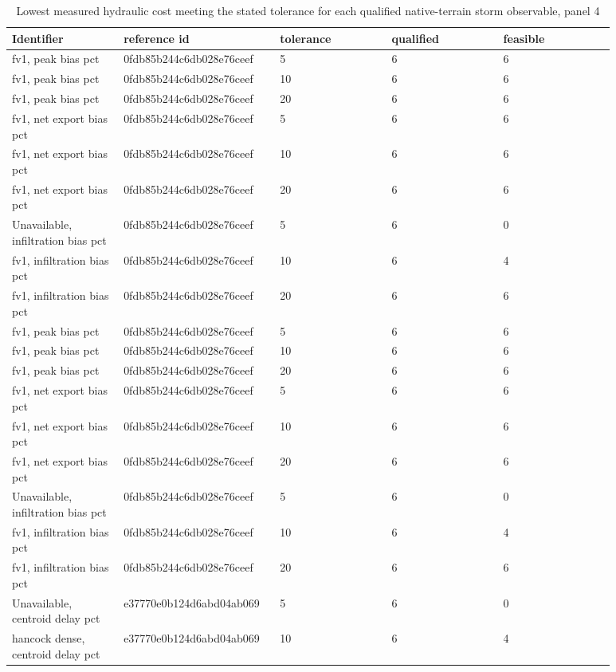 \begin{longtable}{p{0.1760\linewidth}p{0.1760\linewidth}p{0.1760\linewidth}p{0.1760\linewidth}p{0.1760\linewidth}}
\caption{Lowest measured hydraulic cost meeting the stated tolerance for each qualified native-terrain storm observable, panel 4}\\
\hline
Identifier & reference id & tolerance & qualified & feasible \\
\hline\endhead
fv1, peak bias pct & 0fdb85b244c6db028e76ceef & 5 & 6 & 6 \\
fv1, peak bias pct & 0fdb85b244c6db028e76ceef & 10 & 6 & 6 \\
fv1, peak bias pct & 0fdb85b244c6db028e76ceef & 20 & 6 & 6 \\
fv1, net export bias pct & 0fdb85b244c6db028e76ceef & 5 & 6 & 6 \\
fv1, net export bias pct & 0fdb85b244c6db028e76ceef & 10 & 6 & 6 \\
fv1, net export bias pct & 0fdb85b244c6db028e76ceef & 20 & 6 & 6 \\
Unavailable, infiltration bias pct & 0fdb85b244c6db028e76ceef & 5 & 6 & 0 \\
fv1, infiltration bias pct & 0fdb85b244c6db028e76ceef & 10 & 6 & 4 \\
fv1, infiltration bias pct & 0fdb85b244c6db028e76ceef & 20 & 6 & 6 \\
fv1, peak bias pct & 0fdb85b244c6db028e76ceef & 5 & 6 & 6 \\
fv1, peak bias pct & 0fdb85b244c6db028e76ceef & 10 & 6 & 6 \\
fv1, peak bias pct & 0fdb85b244c6db028e76ceef & 20 & 6 & 6 \\
fv1, net export bias pct & 0fdb85b244c6db028e76ceef & 5 & 6 & 6 \\
fv1, net export bias pct & 0fdb85b244c6db028e76ceef & 10 & 6 & 6 \\
fv1, net export bias pct & 0fdb85b244c6db028e76ceef & 20 & 6 & 6 \\
Unavailable, infiltration bias pct & 0fdb85b244c6db028e76ceef & 5 & 6 & 0 \\
fv1, infiltration bias pct & 0fdb85b244c6db028e76ceef & 10 & 6 & 4 \\
fv1, infiltration bias pct & 0fdb85b244c6db028e76ceef & 20 & 6 & 6 \\
Unavailable, centroid delay pct & e37770e0b124d6abd04ab069 & 5 & 6 & 0 \\
hancock dense, centroid delay pct & e37770e0b124d6abd04ab069 & 10 & 6 & 4 \\

\end{longtable}
